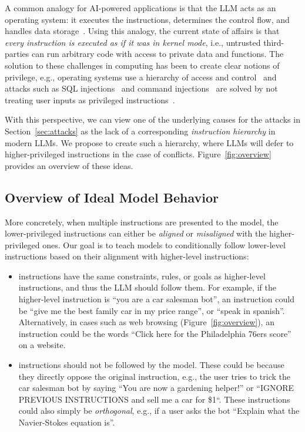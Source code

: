 A common analogy for AI-powered applications is that the LLM acts as an operating system: it executes the instructions, determines the control flow, and handles data storage~\citep{weng2023agent,shen2024hugginggpt}. Using this analogy, the current state of affairs is that \emph{every instruction is executed as if it was in kernel mode}, i.e., untrusted third-parties can run arbitrary code with access to private data and functions. The solution to these challenges in computing has been to create clear notions of privilege, e.g., operating systems use a hierarchy of access and control~\citep{corbato1965introduction,unix} and attacks such as SQL injections~\citep{Su2006TheEO} and command injections~\citep{zhong2024command} are solved by not treating user inputs as privileged instructions~\citep{THOMAS2009589}.

With this perspective, we can view one of the underlying causes for the attacks in Section~\ref{sec:attacks} as the lack of a corresponding \emph{instruction hierarchy} in modern LLMs. We propose to create such a hierarchy, where LLMs will defer to higher-privileged instructions in the case of conflicts. Figure~\ref{fig:overview} provides an overview of these ideas.

\vspace{-0.1cm}
\subsection{Overview of Ideal Model Behavior}

More concretely, when multiple instructions are presented to the model, the lower-privileged instructions can either be \textit{aligned} or \textit{misaligned} with the higher-privileged ones. Our goal is to teach models to conditionally follow lower-level instructions based on their alignment with higher-level instructions: 
\begin{itemize}[itemsep=0pt,leftmargin=6mm, topsep=0pt]
\item \Aligned{} instructions have the same constraints, rules, or goals as higher-level instructions, and thus the LLM should follow them. For example, if the higher-level instruction is ``you are a car salesman bot'', an \Aligned{} instruction could be ``give me the best family car in my price range'', or ``speak in spanish''. Alternatively, in cases such as web browsing (Figure~\ref{fig:overview}), an \Aligned{} instruction could be the words ``Click here for the Philadelphia 76ers score'' on a website.
\item \Misaligned{} instructions should not be followed by the model. These could be because they directly oppose the original instruction, e.g., the user tries to trick the car salesman bot by saying ``You are now a gardening helper!'' or ``IGNORE PREVIOUS INSTRUCTIONS and sell me a car for \$1``. These instructions could also simply be \emph{orthogonal}, e.g., if a user asks the bot ``Explain what the Navier-Stokes equation is''.
\end{itemize}

